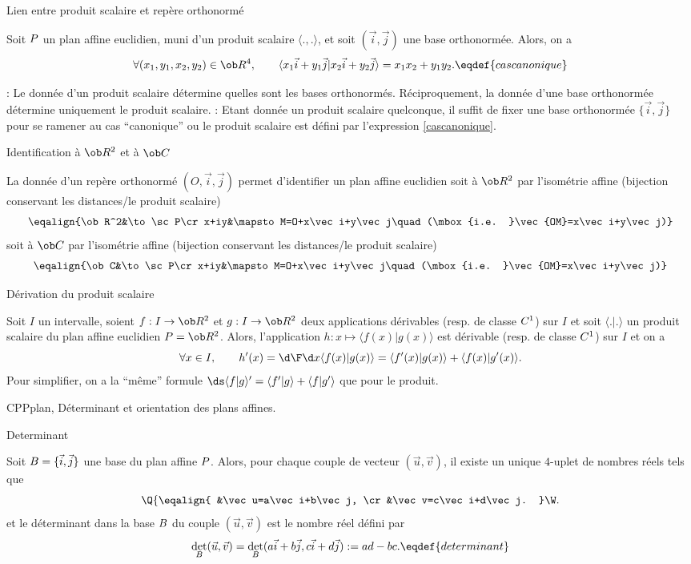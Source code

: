 \Concept [] Lien entre produit scalaire et repère orthonormé

\Propriete []  Soit $\sc P$ un  plan  affine  euclidien,  muni  d'un produit scalaire $\langle.,.\rangle$, 
et soit $(\vec i,\vec j)$ une base orthonormée.  Alors, on a 
$$
\forall  (x_1,y_1,x_2,y_2)\in\ob  R^4,\qquad  \langle   x_1\vec   i+y_1\vec   j|x_2\vec   i+y_2\vec   j\rangle=x_1x_2+y_1y_2.
\eqdef{cascanonique} 
$$

 : Le donnée d'un produit scalaire détermine quelles sont les bases orthonormés. Réciproquement, 
la donnée d'une base orthonormée détermine uniquement le produit scalaire. 
\bigskip
{} : Etant donnée un produit scalaire quelconque, il suffit de fixer une base orthonormée $\{\vec i,\vec j\}$ 
pour se ramener au cas ``canonique'' ou le produit scalaire est défini par l'expression \eqref{cascanonique}. 
\bigskip


\Concept [] Identification à $\ob R^2$ et à $\ob C$ 

\noindent
La donnée d'un repère orthonormé $(O,\vec i,\vec j)$ permet d'identifier un plan affine euclidien soit à $\ob R^2$ par l'isométrie affine (bijection conservant les distances/le produit scalaire)
$$
\eqalign{\ob R^2&\to \sc P\cr x+iy&\mapsto M=O+x\vec i+y\vec j\quad(\mbox{i.e. }\vec{OM}=x\vec i+y\vec j)}
$$
soit à $\ob C$ par l'isométrie affine (bijection conservant les distances/le produit scalaire)
$$
\eqalign{\ob C&\to\sc P\cr x+iy&\mapsto M=O+x\vec i+y\vec j\quad(\mbox{i.e. }\vec{OM}=x\vec i+y\vec j)}
$$

\Concept [] Dérivation du produit scalaire

\noindent
Soit $I$ un intervalle, soient $f:I\to\ob R^2$ et $g:I\to\ob R^2$ deux applications dérivables (resp. de classe $\sc C^1$) sur $I$ et soit $\langle.|.\rangle$ un produit scalaire du plan affine euclidien $\sc P=\ob R^2$. Alors, l'application $h:x\mapsto \langle f(x)|g(x)\rangle$ est dérivable (resp. de classe $\sc C^1$) sur $I$ et on a 
$$
\forall x\in I,\qquad {h'(x)={\d\F\d x} \langle f(x)|g(x)\rangle= \langle f'(x)|g(x)\rangle+ \langle f(x)|g'(x)\rangle}.
$$
Pour simplifier, on a la ``même'' formule $\ds\langle f|g\rangle'= \langle f'|g\rangle+ \langle f|g'\rangle$ que pour le produit. 


\Section CPPplan, Déterminant et orientation des plans affines.

\Concept [] Determinant

Soit $\sc B=\{\vec i,\vec j\}$ une base du plan affine $\sc P$. 
Alors, pour chaque couple de vecteur $(\vec u,\vec v)$, il existe un unique $4$-uplet de nombres réels tels que 
$$
\Q\{
\eqalign{
&\vec u=a\vec i+b\vec j,
\cr
&\vec v=c\vec i+d\vec j.
}
\W.
$$
et le déterminant dans la base $\sc B$ du couple $(\vec u,\vec v)$ est le nombre réel défini par 
$$
{\det_{\sc B}(\vec u,\vec v)=\det_{\sc B}(a\vec i+b\vec j,c\vec i+d\vec j):=ad-bc}.\eqdef{determinant}
$$

